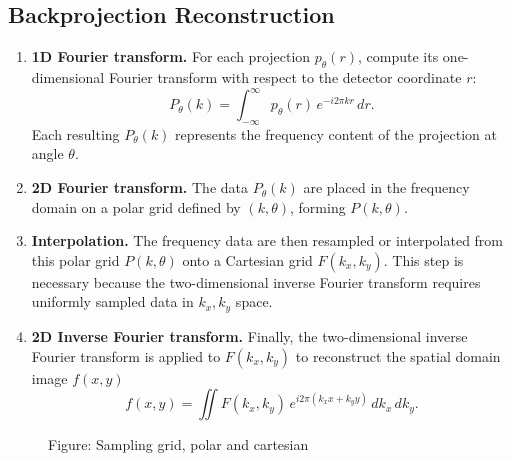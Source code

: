 \documentclass[../../../main.tex]{subfiles}
\begin{document}
\subsection{Backprojection Reconstruction}
\begin{enumerate}
    \item \textbf{1D Fourier transform.} For each projection \( p_\theta(r) \), compute its one-dimensional Fourier transform with respect to the detector coordinate \( r \):
    \[
    P_\theta(k) = \int_{-\infty}^{\infty} p_\theta(r)\, e^{-i 2 \pi k r}\, dr.
    \]
    Each resulting \( P_\theta(k) \) represents the frequency content of the projection at angle \( \theta \).

    \item \textbf{2D Fourier transform.} The data \( P_\theta(k) \) are placed in the frequency domain on a polar grid defined by \( (k, \theta) \), forming \( P(k,\theta) \).

    \item \textbf{Interpolation.} The frequency data are then resampled or interpolated from this polar grid \( P(k,\theta) \) onto a Cartesian grid \( F(k_x, k_y) \). This step is necessary because the two-dimensional inverse Fourier transform requires uniformly sampled data in \( k_x, k_y \) space.

    \item \textbf{2D Inverse Fourier transform.} Finally, the two-dimensional inverse Fourier transform is applied to \( F(k_x, k_y) \) to reconstruct the spatial domain image \( f(x,y) \)
    \[
    f(x,y) = \iint F(k_x, k_y)\, e^{i 2 \pi (k_x x + k_y y)}\, dk_x\, dk_y.
    \]
\end{enumerate}
\begin{figure*}
    \centering
    \caption*{Figure: Sampling grid, polar and cartesian}
\end{figure*}
\end{document}
